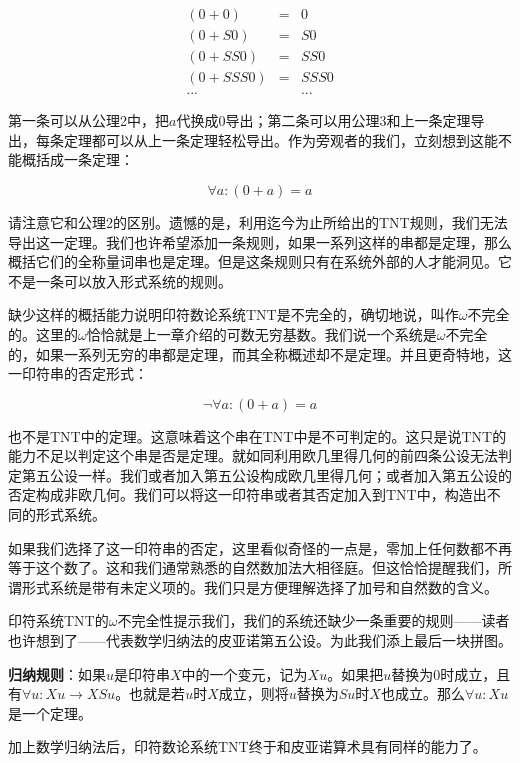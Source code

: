 \documentclass{article}
\begin{document}
\[
\begin{array}{rcl}
(0 + 0) & = & 0 \\
(0 + S0) & = & S0 \\
(0 + SS0) & = & SS0 \\
(0 + SSS0) & = & SSS0 \\
... & & ...
\end{array}
\]

第一条可以从公理2中，把$a$代换成0导出；第二条可以用公理3和上一条定理导出，每条定理都可以从上一条定理轻松导出。作为旁观者的我们，立刻想到这能不能概括成一条定理：

\[
\forall a: (0 + a) = a
\]

请注意它和公理2的区别。遗憾的是，利用迄今为止所给出的TNT规则，我们无法导出这一定理。我们也许希望添加一条规则，如果一系列这样的串都是定理，那么概括它们的全称量词串也是定理。但是这条规则只有在系统外部的人才能洞见。它不是一条可以放入形式系统的规则。

缺少这样的概括能力说明印符数论系统TNT是不完全的，确切地说，叫作$\omega$不完全的。这里的$\omega$恰恰就是上一章介绍的可数无穷基数。我们说一个系统是$\omega$不完全的，如果一系列无穷的串都是定理，而其全称概述却不是定理。并且更奇特地，这一印符串的否定形式：

\[
\lnot \forall a: (0 + a) = a
\]

也不是TNT中的定理。这意味着这个串在TNT中是不可判定的。这只是说TNT的能力不足以判定这个串是否是定理。就如同利用欧几里得几何的前四条公设无法判定第五公设一样。我们或者加入第五公设构成欧几里得几何；或者加入第五公设的否定构成非欧几何。我们可以将这一印符串或者其否定加入到TNT中，构造出不同的形式系统。

如果我们选择了这一印符串的否定，这里看似奇怪的一点是，零加上任何数都不再等于这个数了。这和我们通常熟悉的自然数加法大相径庭。但这恰恰提醒我们，所谓形式系统是带有未定义项的。我们只是方便理解选择了加号和自然数的含义。

印符系统TNT的$\omega$不完全性提示我们，我们的系统还缺少一条重要的规则——读者也许想到了——代表数学归纳法的皮亚诺第五公设。为此我们添上最后一块拼图。

\textbf{归纳规则}：如果$u$是印符串$X$中的一个变元，记为$X{u}$。如果把$u$替换为0时成立，且有$\forall u: X{u} \to X{Su}$。也就是若$u$时$X$成立，则将$u$替换为$Su$时$X$也成立。那么$\forall u: X{u}$是一个定理。

加上数学归纳法后，印符数论系统TNT终于和皮亚诺算术具有同样的能力了。

\begin{Exercise}
\end{Exercise}
\end{document}
